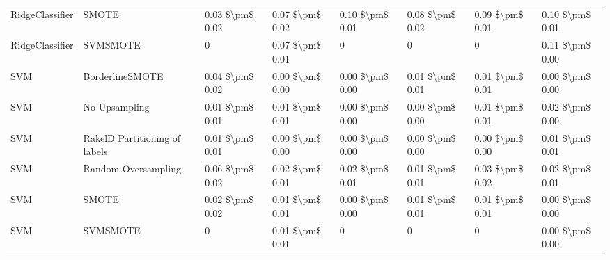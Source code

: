 \begin{tabular}{llllllll}
                RidgeClassifier &                         SMOTE & 0.03 \$\textbackslash pm\$ 0.02 &           0.07 \$\textbackslash pm\$ 0.02 &       0.10 \$\textbackslash pm\$ 0.01 &        0.08 \$\textbackslash pm\$ 0.02 &                         0.09 \$\textbackslash pm\$ 0.01 &     0.10 \$\textbackslash pm\$ 0.01 \\
                RidgeClassifier &                      SVMSMOTE &               0 &           0.07 \$\textbackslash pm\$ 0.01 &                     0 &                      0 &                                       0 &     0.11 \$\textbackslash pm\$ 0.00 \\
                            SVM &               BorderlineSMOTE & 0.04 \$\textbackslash pm\$ 0.02 &           0.00 \$\textbackslash pm\$ 0.00 &       0.00 \$\textbackslash pm\$ 0.00 &        0.01 \$\textbackslash pm\$ 0.01 &                         0.01 \$\textbackslash pm\$ 0.01 &     0.00 \$\textbackslash pm\$ 0.00 \\
                            SVM &                 No Upsampling & 0.01 \$\textbackslash pm\$ 0.01 &           0.01 \$\textbackslash pm\$ 0.01 &       0.00 \$\textbackslash pm\$ 0.00 &        0.00 \$\textbackslash pm\$ 0.00 &                         0.01 \$\textbackslash pm\$ 0.01 &     0.02 \$\textbackslash pm\$ 0.00 \\
                            SVM & RakelD Partitioning of labels & 0.01 \$\textbackslash pm\$ 0.01 &           0.00 \$\textbackslash pm\$ 0.00 &       0.00 \$\textbackslash pm\$ 0.00 &        0.00 \$\textbackslash pm\$ 0.00 &                         0.00 \$\textbackslash pm\$ 0.00 &     0.01 \$\textbackslash pm\$ 0.01 \\
                            SVM &           Random Oversampling & 0.06 \$\textbackslash pm\$ 0.02 &           0.02 \$\textbackslash pm\$ 0.01 &       0.02 \$\textbackslash pm\$ 0.01 &        0.01 \$\textbackslash pm\$ 0.01 &                         0.03 \$\textbackslash pm\$ 0.02 &     0.02 \$\textbackslash pm\$ 0.01 \\
                            SVM &                         SMOTE & 0.02 \$\textbackslash pm\$ 0.02 &           0.01 \$\textbackslash pm\$ 0.01 &       0.00 \$\textbackslash pm\$ 0.00 &        0.01 \$\textbackslash pm\$ 0.01 &                         0.01 \$\textbackslash pm\$ 0.01 &     0.00 \$\textbackslash pm\$ 0.00 \\
                            SVM &                      SVMSMOTE &               0 &           0.01 \$\textbackslash pm\$ 0.01 &                     0 &                      0 &                                       0 &     0.00 \$\textbackslash pm\$ 0.00 \\

\end{tabular}
